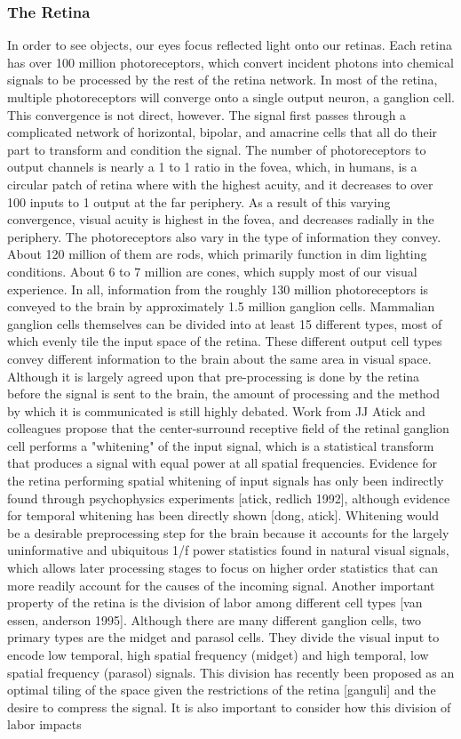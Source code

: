 \subsubsection{The Retina} In order to see objects, our eyes focus reflected light onto our retinas. Each retina has over 100 million photoreceptors, which convert incident photons into chemical signals to be processed by the rest of the retina network. In most of the retina, multiple photoreceptors will converge onto a single output neuron, a ganglion cell. This convergence is not direct, however. The signal first passes through a complicated network of horizontal, bipolar, and amacrine cells that all do their part to transform and condition the signal. The number of photoreceptors to output channels is nearly a 1 to 1 ratio in the fovea, which, in humans, is a circular patch of retina where with the highest acuity, and it decreases to over 100 inputs to 1 output at the far periphery. As a result of this varying convergence, visual acuity is highest in the fovea, and decreases radially in the periphery. The photoreceptors also vary in the type of information they convey. About 120 million of them are rods, which primarily function in dim lighting conditions. About 6 to 7 million are cones, which supply most of our visual experience. In all, information from the roughly 130 million photoreceptors is conveyed to the brain by approximately 1.5 million ganglion cells. Mammalian ganglion cells themselves can be divided into at least 15 different types, most of which evenly tile the input space of the retina. These different output cell types convey different information to the brain about the same area in visual space. Although it is largely agreed upon that pre-processing is done by the retina before the signal is sent to the brain, the amount of processing and the method by which it is communicated is still highly debated. Work from JJ Atick and colleagues propose that the center-surround receptive field of the retinal ganglion cell performs a "whitening" of the input signal, which is a statistical transform that produces a signal with equal power at all spatial frequencies. Evidence for the retina performing spatial whitening of input signals has only been indirectly found through psychophysics experiments [atick, redlich 1992], although evidence for temporal whitening has been directly shown [dong, atick]. Whitening would be a desirable preprocessing step for the brain because it accounts for the largely uninformative and ubiquitous 1/f power statistics found in natural visual signals, which allows later processing stages to focus on higher order statistics that can more readily account for the causes of the incoming signal. Another important property of the retina is the division of labor among different cell types [van essen, anderson 1995]. Although there are many different ganglion cells, two primary types are the midget and parasol cells. They divide the visual input to encode low temporal, high spatial frequency (midget) and high temporal, low spatial frequency (parasol) signals. This division has recently been proposed as an optimal tiling of the space given the restrictions of the retina [ganguli] and the desire to compress the signal. It is also important to consider how this division of labor impacts 